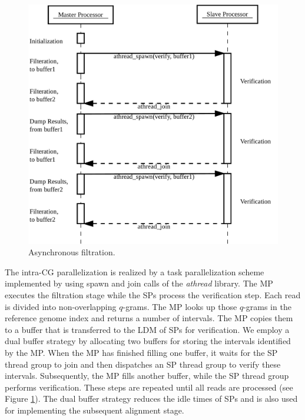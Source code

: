 \begin{figure}[!htb]
  \includegraphics[width=1\linewidth]{figures/AsyncPara}
  \caption{Asynchronous filtration.}
  \label{AsyncPara}
\end{figure}

The intra-CG parallelization is realized by a task parallelization
scheme implemented by using spawn and join calls of the {\em athread}
library. The MP executes the filtration stage while the SPs process
the verification step. Each read is divided into non-overlapping
$q$-grams. The MP looks up those $q$-grams in the reference genome
index and returns a number of intervals. The MP copies them to a
buffer that is transferred to the LDM of SPs for verification. We
employ a dual buffer strategy by allocating two buffers for storing
the intervals identified by the MP. When the MP has finished filling
one buffer, it waits for the SP thread group to join and then
dispatches an SP thread group to verify these intervals. Subsequently,
the MP fills another buffer, while the SP thread group performs
verification. These steps are repeated until all reads are processed
(see Figure \ref{AsyncPara}). The dual buffer strategy reduces the
idle times of SPs and is also used for implementing the subsequent
alignment stage.

